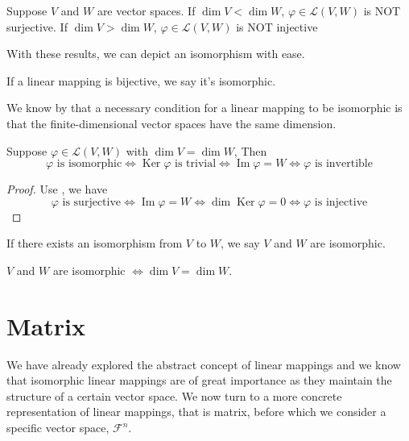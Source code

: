 \begin{corollary} \label{cor: mapping}
    Suppose $V$ and $W$ are vector spaces. If $\dim V < \dim W$, $\varphi \in \mathcal{L}(V,W)$ is NOT surjective. If $\dim V > \dim W$, $\varphi \in \mathcal{L}(V,W)$ is NOT injective
\end{corollary}

With these results, we can depict an isomorphism with ease.
\begin{definition}
    If a linear mapping is bijective, we say it's isomorphic.
\end{definition}

We know by  that a necessary condition for a linear mapping to be isomorphic is that the finite-dimensional vector spaces have the same dimension.
\begin{corollary}
    Suppose $\varphi \in \mathcal{L}(V,W)$ with $\dim V = \dim W$, Then
    $$\varphi \text{ is isomorphic} \iff \operatorname{Ker} \varphi \text{ is trivial} \iff \operatorname{Im} \varphi = W \iff \varphi \text{ is invertible}$$
\end{corollary}
\begin{proof}
    Use , we have 
    $$\varphi \text{ is surjective} \iff \operatorname{Im} \varphi = W \iff \dim \operatorname{Ker} \varphi = 0 \iff \varphi \text{ is injective}$$
\end{proof}

If there exists an isomorphism from $V$ to $W$, we say $V$ and $W$ are isomorphic.
\begin{theorem} \label{thm: isomorphic_spaces}
    $V$ and $W$ are isomorphic $\iff \dim V = \dim W$. 
\end{theorem}

\section{Matrix}
We have already explored the abstract concept of linear mappings and we know that isomorphic linear mappings are of great importance as they maintain the structure of a certain vector space.
We now turn to a more concrete representation of linear mappings, that is matrix, before which we consider a specific vector space, $\mathcal{F}^{n}$.


